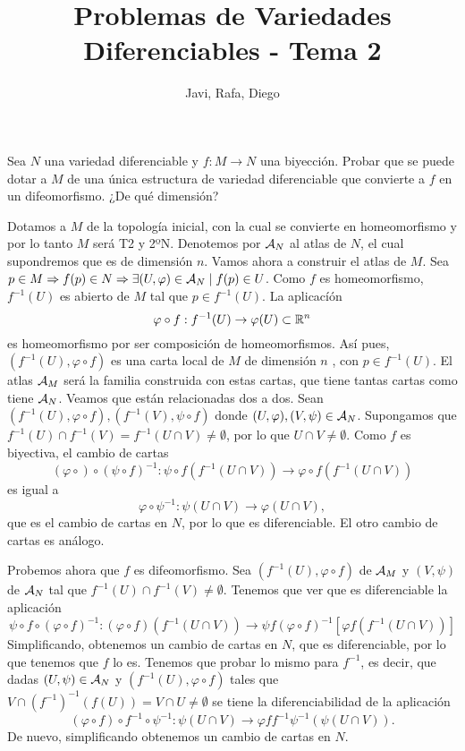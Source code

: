\documentclass[twoside]{article}
\begin{document}
\title{Problemas de Variedades Diferenciables - Tema 2}
\author{Javi, Rafa, Diego}
\maketitle



\begin{ejercicio}{5}
Sea $N$ una variedad diferenciable y $f : M \to N$ una biyección.
Probar que se puede dotar a $M$ de una única estructura de variedad diferenciable
que convierte a $f$ en un difeomorfismo. ¿De qué dimensión?
\end{ejercicio}
\begin{solucion}
Dotamos a $M$ de la topología inicial, con la cual se convierte en homeomorfismo y por lo tanto $M$ será T2 y 2ºN. Denotemos por $\mathcal{A}_N$ al atlas de $N$, el cual supondremos que es de dimensión $n$. Vamos ahora a construir el atlas de $M$. Sea $p\in M\Rightarrow f(p)\in N\Rightarrow\exists (U,\varphi)\in\mathcal{A}_N\mid f(p)\in U$. Como $f$ es homeomorfismo, $f^{-1}(U)$ es abierto de $M$ tal que $p\in f^{-1}(U)$. La aplicacíón 
$$\varphi\circ f:f^{-1}(U)\to\varphi(U)\subset\mathbb{R}^n$$
es homeomorfismo por ser composición de homeomorfismos. Así pues, $(f^{-1}(U),\varphi\circ f)$ es una carta local de $M$ de dimensión $n$ , con $p\in f^{-1}(U)$. El atlas $\mathcal{A}_M$ será la familia construida con estas cartas, que tiene tantas cartas como tiene $\mathcal{A}_N$. Veamos que están relacionadas dos a dos. Sean $(f^{-1}(U),\varphi\circ f),(f^{-1}(V),\psi\circ f)$ donde $(U,\varphi),(V,\psi)\in\mathcal{A}_N$. Supongamos que $f^{-1}(U)\cap f^{-1}(V)=f^{-1}(U\cap V)\neq\emptyset$, por lo que $U\cap V\neq\emptyset$. Como $f$ es biyectiva, el cambio de cartas
$$(\varphi\circ )\circ(\psi\circ f)^{-1}:\psi\circ f(f^{-1}(U\cap V))\to\varphi\circ f(f^{-1}(U\cap V))$$
es igual a
$$\varphi\circ\psi^{-1}:\psi(U\cap V)\to\varphi(U\cap V),$$
que es el cambio de cartas en $N$, por lo que es diferenciable. El otro cambio de cartas es análogo. 

Probemos ahora que $f$ es difeomorfismo. Sea $(f^{-1}(U),\varphi\circ f)$ de $\mathcal{A}_M$ y $(V,\psi)$ de $\mathcal{A}_N$ tal que $f^{-1}(U)\cap f^{-1}(V)\neq\emptyset$. Tenemos que ver que es diferenciable la aplicación
$$\psi\circ f\circ(\varphi\circ f)^{-1}:(\varphi\circ f)(f^{-1}(U\cap V))\to\psi f(\varphi\circ f)^{-1}[\varphi f(f^{-1}(U\cap V))]$$
Simplificando, obtenemos un cambio de cartas en $N$, que es diferenciable, por lo que tenemos que $f$ lo es. Tenemos que probar lo mismo para $f^{-1}$, es decir, que dadas $(U,\psi)\in\mathcal{A}_N$ y $(f^{-1}(U),\varphi\circ f)$ tales que $V\cap (f^{-1})^{-1}(f(U))=V\cap U\neq\emptyset$ se tiene la diferenciabilidad de la aplicación
$$(\varphi\circ f)\circ f^{-1}\circ\psi^{-1}:\psi(U\cap V)\to\varphi ff^{-1}\psi^{-1}(\psi(U\cap V)).$$
De nuevo, simplificando obtenemos un cambio de cartas en $N$. 


\end{solucion}
\end{document}
